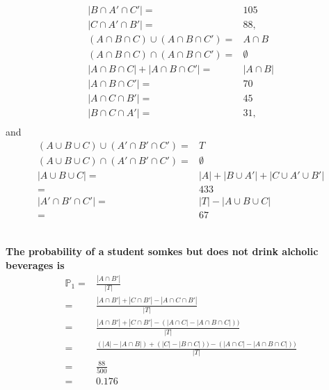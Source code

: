 \documentclass{article}
\begin{document}
{\begin{equation*}
\begin{split}
                    |B\cap A'\cap C'|=&105\\
                    |C\cap A' \cap B'|=&88,\\
                    (A\cap B \cap C)\cup(A\cap B \cap C')=&A\cap B\\
                    (A\cap B \cap C)\cap(A\cap B \cap C')=&\emptyset\\
                    |A\cap B \cap C|+|A\cap B \cap C'|=&|A\cap B|\\
                    |A\cap B \cap C'|=&70\\
                    |A\cap C \cap B'|=&45\\
                    |B\cap C \cap A'|=&31,\\
                \end{split}
            \end{equation*}
            and
            \begin{equation*}
                \begin{split}
                    (A\cup B\cup C)\cup (A'\cap B' \cap C')=&T\\
                    (A\cup B\cup C)\cap (A'\cap B' \cap C')=&\emptyset\\
                    |A\cup B\cup C|=&|A|+|B\cup A'|+|C\cup A'\cup B'|\\
                    =&433\\
                    |A'\cap B' \cap C'|=&|T|-|A\cup B\cup C|\\
                    =&67\\
                \end{split}
            \end{equation*}
        }
        \subsection{}
            \paragraph{
                The probability of a student somkes but does not drink alcholic beverages is 
                \begin{equation*}
                    \begin{split}
                        \mathbb{P}_1=&\frac{|A\cap B'|}{|T|}\\
                            =&\frac{|A\cap B'|+|C\cap B'|-|A\cap C\cap B'|}{|T|}\\
                            =&\frac{|A\cap B'|+|C\cap B'|-(|A\cap C|-|A\cap B \cap C|))}{|T|}\\
                            =&\frac{(|A|-|A\cap B|)+(|C|-|B\cap C|))-(|A\cap C|-|A\cap B \cap C|))}{|T|}\\
                            =&\frac{88}{500}\\
                            =&0.176\\
                    \end{split}
                \end{equation*} 
            }
\end{document}
